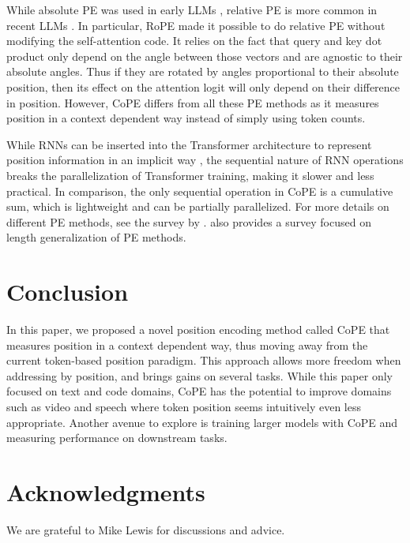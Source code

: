\documentclass{article}
\newcommand{\ours}{CoPE\xspace}
\begin{document}
While absolute PE was used in  early LLMs \citep{radford2019language}, relative PE is more common in recent LLMs \citep{Touvron2023Llama2O,Touvron2023LLaMAOA,Jiang2023Mistral7}.
In particular, RoPE \citep{su2024roformer} made it possible to do relative PE without modifying the self-attention code.
It relies on the fact that query and key dot product only depend on the angle between those vectors and are agnostic to their absolute angles. Thus if they are rotated by angles proportional to their absolute position, then its effect on the attention logit will only depend on their difference in position.
However, \ours{} differs from all these PE methods as it measures position in a context dependent way instead of simply using token counts.

While RNNs can be inserted into the Transformer architecture to represent position information in an implicit way \citep{wang2019r,neishi2019relation}, the sequential nature of RNN operations breaks the parallelization of Transformer training, making it slower and less practical. In comparison, the only sequential operation in \ours{} is a cumulative sum, which is lightweight and can be partially parallelized.
For more details on different PE methods, see the survey by \citet{dufter2022position}.
\citet{zhao2023length} also provides a survey focused on length generalization of PE methods.

\section{Conclusion}
In this paper, we proposed a novel position encoding method called \ours{} that measures position in a context dependent way, thus moving away from the current token-based position paradigm.
This approach allows more freedom when addressing by position, and brings gains on several tasks.
%
While this paper only focused on text and code domains, \ours{} has the potential to improve  domains such as video and speech  where token position seems intuitively even less appropriate.
Another avenue to explore is training larger models with \ours{} and measuring performance on downstream tasks.

\section{Acknowledgments}

We are grateful to Mike Lewis for discussions and advice.
\end{document}
